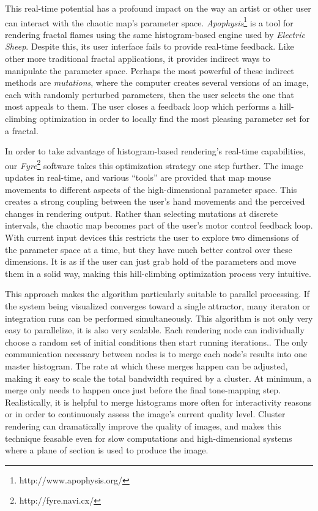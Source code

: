 \documentclass[letterpaper, 11pt]{article}
\begin{document}
This real-time potential has a profound impact on the way an artist or other user can
interact with the chaotic map's parameter space. \emph{Apophysis}\footnote{http://www.apophysis.org/}
is a tool for rendering fractal flames using the same histogram-based engine used by \emph{Electric Sheep}.
Despite this, its user interface fails to provide real-time feedback. Like other more traditional
fractal applications, it provides indirect ways to manipulate the parameter space. Perhaps the most
powerful of these indirect methods are \emph{mutations}, where the computer creates several versions
of an image, each with randomly perturbed parameters, then the user selects the one that most appeals
to them. The user closes a feedback loop which performs a hill-climbing optimization in order
to locally find the most pleasing parameter set for a fractal.

In order to take advantage of histogram-based rendering's real-time capabilities, our
\emph{Fyre}\footnote{http://fyre.navi.cx/} software takes this optimization strategy one step
further. The image updates in real-time, and various ``tools'' are provided that map mouse movements
to different aspects of the high-dimensional parameter space. This creates a strong coupling
between the user's hand movements and the perceived changes in rendering output. Rather than
selecting mutations at discrete intervals, the chaotic map becomes part of the user's motor control
feedback loop. With current input devices this restricts the user to explore two dimensions of the
parameter space at a time, but they have much better control over these dimensions. It is as if the
user can just grab hold of the parameters and move them in a solid way, making this hill-climbing
optimization process very intuitive.

This approach makes the algorithm particularly suitable to parallel processing.  If the
system being visualized converges toward a single attractor, many iteraton or integration
runs can be performed simultaneously. This algorithm is not only very easy to parallelize, it is
also very scalable. Each rendering node can individually choose a random
set of initial conditions then start running iterations.. The only communication necessary between
nodes is to merge each node's results into one master histogram. The rate at which these merges
happen can be adjusted, making it easy to scale the total bandwidth required by a cluster.
At minimum, a merge only needs to happen once just before the final tone-mapping
step. Realistically, it is helpful to merge histograms more often for interactivity reasons
or in order to continuously assess the image's current quality level.
Cluster rendering can dramatically improve the quality of images, and makes
this technique feasable even for slow computations and high-dimensional systems where a
plane of section is used to produce the image.
\end{document}

